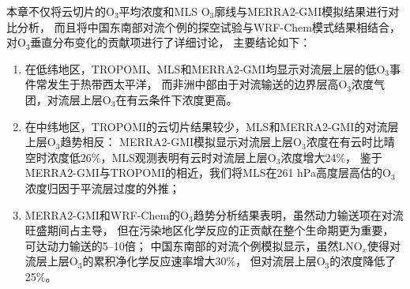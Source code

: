 本章不仅将云切片的O$_3$平均浓度和MLS O$_3$廓线与MERRA2-GMI模拟结果进行对比分析，
而且将中国东南部对流个例的探空试验与WRF-Chem模式结果相结合，对O$_3$垂直分布变化的贡献项进行了详细讨论，
主要结论如下：

\begin{enumerate}[label=（\arabic*）, labelindent=\parindent, leftmargin=0pt, widest=0, itemindent=*, topsep=0pt, partopsep=0pt, parsep=0pt]

\item 在低纬地区，TROPOMI、MLS和MERRA2-GMI均显示对流层上层的低O$_3$事件常发生于热带西太平洋，
而非洲中部由于对流输送的边界层高O$_3$浓度气团，对流层上层O$_3$在有云条件下浓度更高。

\item 在中纬地区，TROPOMI的云切片结果较少，MLS和MERRA2-GMI的对流层上层O$_3$趋势相反：
MERRA2-GMI模拟显示对流层上层O$_3$浓度在有云时比晴空时浓度低26\%，MLS观测表明有云时对流层上层O$_3$浓度增大24\%，
鉴于MERRA2-GMI与TROPOMI的相近，我们将MLS在261 hPa高度层高估的O$_3$浓度归因于平流层过度的外推；



\item MERRA2-GMI和WRF-Chem的O$_3$趋势分析结果表明，虽然动力输送项在对流旺盛期间占主导，
但在污染地区化学反应的正贡献在整个生命期更为重要，可达动力输送的5--10倍；
中国东南部的对流个例模拟显示，虽然LNO$_x$使得对流层上层O$_3$的累积净化学反应速率增大30\%，
但对流层上层O$_3$的浓度降低了25\%。

\end{enumerate}
